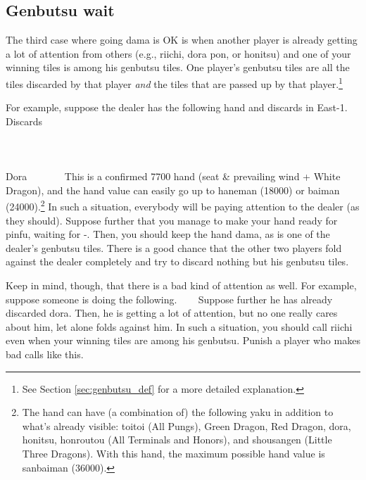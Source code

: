 \subsection{{\jap Genbutsu} wait}  \label{sec:genbutsu}
The third case where going {\jap dama} is OK is when another player is already getting a lot of attention from others (e.g., riichi, {\jap dora} {\jap pon}, or {\jap honitsu}) and one of your winning tiles is among his {\jap genbutsu} tiles.
One player's {\jap genbutsu} tiles are all the tiles discarded by that player \emph{and} the tiles that are passed up by that player.\footnote{See Section \ref{sec:genbutsu_def} for a more detailed explanation.}

\bigskip
For example, suppose the dealer has the following hand and discards in East-1.
\bp
\vspace{-20pt}
{\small Discards}\\ \vspace{-10pt}
\xi{}\\
\vspace{-10pt}
\hspace{-35pt}\\
\vspace{-10pt}
\ep
\bp
{}
\rbai\bai\bai~~\dong\dong\rdong~~\\
\hfill\footnotesize{{\jap Dora}~~~~~~~}
\ep
This is a confirmed 7700 hand (seat \& prevailing wind + White Dragon), and the hand value can easily go up to {\jap haneman} (18000) or {\jap baiman} (24000).\footnote{The hand can have (a combination of) the following {\jap yaku} in addition to what's already visible: {\jap toitoi} (All Pungs), Green Dragon, Red Dragon, {\jap dora}, {\jap honitsu}, {\jap honroutou} (All Terminals and Honors), and {\jap shousangen} (Little Three Dragons). With this hand, the maximum possible hand value is {\jap sanbaiman} (36000).}
In such a situation, everybody will be paying attention to the dealer (as they should). Suppose further that you manage to make your hand ready for {\jap pinfu}, waiting for {\LARGE{}-}. Then, you should keep the hand {\jap dama}, as {\LARGE{}} is one of the dealer's {\jap genbutsu} tiles. There is a good chance that the other two players fold against the dealer completely and try to discard nothing but his {\jap genbutsu} tiles.

\bigskip

Keep in mind, though, that there is a bad kind of attention as well. For example, suppose someone is doing the following.
\bp
{} ~\zhong\zhong\rzhong~~
\ep
Suppose further he has already discarded {\jap dora}. Then, he is getting a lot of attention, but no one really cares about him, let alone folds against him. In such a situation, you should call riichi even when your winning tiles are among his {\jap genbutsu}. Punish a player who makes bad calls like this.

